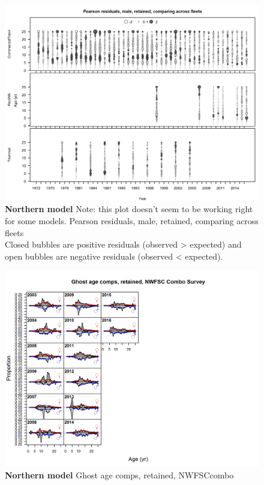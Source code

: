 \documentclass[12pt,]{article}
\begin{document}
\begin{figure}[htbp]
\centering
\includegraphics{./r4ss/plots_mod1/comp_agefit_sex3mkt2_multi-fleet_comparison.png}
\caption{\textbf{Northern model} Note: this plot doesn't seem to be
working right for some models. Pearson residuals, male, retained,
comparing across fleets\\
Closed bubbles are positive residuals (observed \textgreater{} expected)
and open bubbles are negative residuals (observed \textless{} expected).
\label{fig:mod1_16_comp_agefit_sex3mkt2_multi-fleet_comparison}}
\end{figure}

\begin{figure}[htbp]
\centering
\includegraphics{./r4ss/plots_mod1/comp_gstagefit_flt6mkt2.png}
\caption{\textbf{Northern model} Ghost age comps, retained, NWFSCcombo
\label{fig:mod1_17_comp_gstagefit_flt6mkt2}}
\end{figure}
\end{document}
